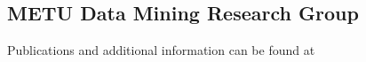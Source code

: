 \subsection{METU Data Mining Research Group}

Publications and additional information can be found at \cite{Datamining}